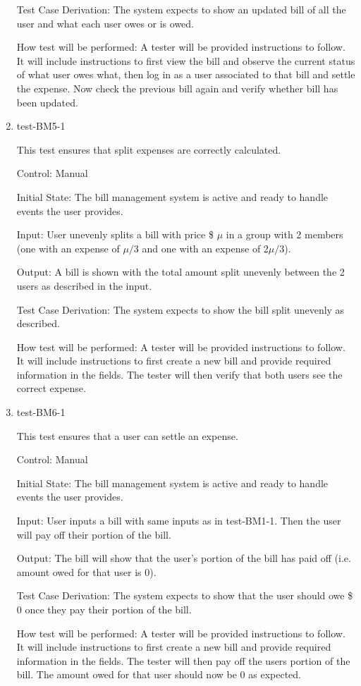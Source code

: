 \documentclass[12pt, titlepage]{article}
\begin{document}
\begin{enumerate}
Test Case Derivation: The system expects to show an updated bill of all the user and what each user owes or is owed.

How test will be performed: A tester will be provided instructions to follow. It will include instructions to first view the bill and observe the current status of what user owes what, then log in as a user associated to that bill and settle the expense. Now check the previous bill again and verify whether bill has been updated.

\item{test-BM5-1\\}

This test ensures that split expenses are correctly calculated.

Control: Manual
					
Initial State: The bill management system is active and ready to handle events the user provides.
					
Input: User unevenly splits a bill with price \$ $\mu$ in a group with 2 members (one with an expense of $\mu/3$ and one with an expense of $2\mu/3$).
					
Output: A bill is shown with the total amount split unevenly between the 2 users as described in the input.

Test Case Derivation: The system expects to show the bill split unevenly as described.

How test will be performed: A tester will be provided instructions to follow. It will include instructions to first create a new bill and provide required information in the fields. The tester will then verify that both users see the correct expense. 

\item{test-BM6-1\\}

This test ensures that a user can settle an expense.

Control: Manual
					
Initial State: The bill management system is active and ready to handle events the user provides.
					
Input: User inputs a bill with same inputs as in test-BM1-1. Then the user will pay off their portion of the bill.
					
Output: The bill will show that the user's portion of the bill has paid off (i.e. amount owed for that user is 0).

Test Case Derivation: The system expects to show that the user should owe \$ 0 once they pay their portion of the bill.

How test will be performed: A tester will be provided instructions to follow. It will include instructions to first create a new bill and provide required information in the fields. The tester will then pay off the users portion of the bill. The amount owed for that user should now be 0 as expected. 

\end{enumerate}
\end{document}
